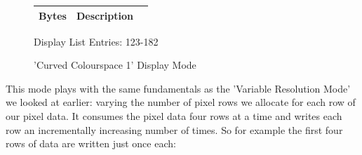 \hspace{0.1cm}
\begin{minipage}[b]{0.31\linewidth}
  \begin{figure}[H]
    {
      \setlength{\tabcolsep}{3.0pt}
      \setlength\cmidrulewidth{\heavyrulewidth} %
      \begin{adjustbox}{height=8.5cm}

        \begin{tabular}{lll}
          \toprule
          Bytes       & Description                                                         \\
          \midrule
        \end{tabular}

      \end{adjustbox}

    }\caption*{Display List Entries: 123-182}
  \end{figure}
\end{minipage}

\clearpage
\begin{figure}[H]
    \centering
    \begin{adjustbox}{width=12cm,center}
    \end{adjustbox}
\caption{'Curved Colourspace 1' Display Mode}
\end{figure}
This mode plays with the same fundamentals as the 'Variable Resolution Mode' we looked at earlier: varying
the number of pixel rows we allocate for each row of our pixel data. It consumes the pixel data four rows
at a time and writes each row an incrementally increasing number of times. So for example the first four rows
of data are written just once each:

